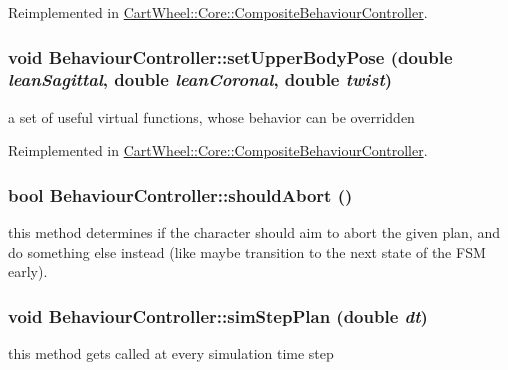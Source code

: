 Reimplemented in \hyperlink{classCartWheel_1_1Core_1_1CompositeBehaviourController_a5b0841672d1b94a3d3dbc51b2a5d0695}{CartWheel::Core::CompositeBehaviourController}.

\hypertarget{classCartWheel_1_1Core_1_1BehaviourController_a1086038c78bc9cd190699d7756285b03}{
\subsubsection[{setUpperBodyPose}]{\setlength{\rightskip}{0pt plus 5cm}void BehaviourController::setUpperBodyPose (double {\em leanSagittal}, \/  double {\em leanCoronal}, \/  double {\em twist})}}
\label{classCartWheel_1_1Core_1_1BehaviourController_a1086038c78bc9cd190699d7756285b03}
a set of useful virtual functions, whose behavior can be overridden 

Reimplemented in \hyperlink{classCartWheel_1_1Core_1_1CompositeBehaviourController_a0c01e07f056c9af2c59c354471859d29}{CartWheel::Core::CompositeBehaviourController}.

\hypertarget{classCartWheel_1_1Core_1_1BehaviourController_a0517693f7fe1a850ac9c18755e918672}{
\subsubsection[{shouldAbort}]{\setlength{\rightskip}{0pt plus 5cm}bool BehaviourController::shouldAbort ()}}
\label{classCartWheel_1_1Core_1_1BehaviourController_a0517693f7fe1a850ac9c18755e918672}
this method determines if the character should aim to abort the given plan, and do something else instead (like maybe transition to the next state of the FSM early). \hypertarget{classCartWheel_1_1Core_1_1BehaviourController_a5a0b7293c3693f7a5860ae51bb65164e}{
\subsubsection[{simStepPlan}]{\setlength{\rightskip}{0pt plus 5cm}void BehaviourController::simStepPlan (double {\em dt})}}
\label{classCartWheel_1_1Core_1_1BehaviourController_a5a0b7293c3693f7a5860ae51bb65164e}
this method gets called at every simulation time step 


